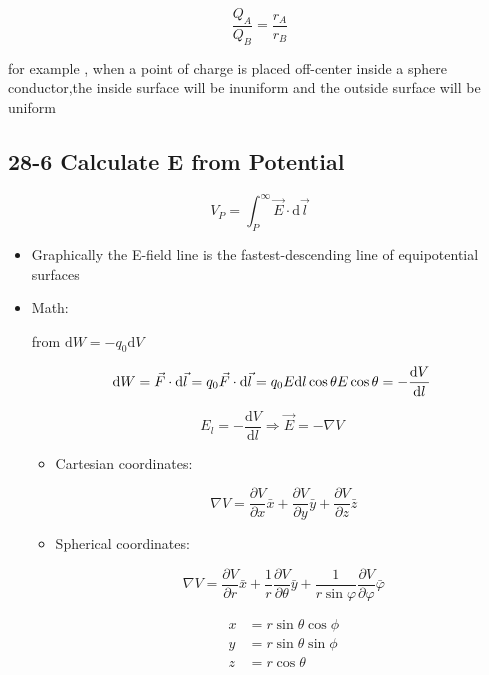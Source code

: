 \documentclass[
]{article}
\begin{document}
\[
\frac{Q_A}{Q_B}=\frac{r_A}{r_B}
\]

for example , when a point of charge is placed off-center inside a
sphere conductor,the inside surface will be inuniform and the outside
surface will be uniform

\hypertarget{calculate-e-from-potential}{%
\subsection{28-6 Calculate E from
Potential}\label{calculate-e-from-potential}}

\[
V_P=\int _{P}^{\infty }\vec E\cdot \mathrm d \vec l
\]

\begin{itemize}
\item
  Graphically the E-field line is the fastest-descending line of
  equipotential surfaces
\item
  Math:

  from \(\mathrm d W=-q_0 \mathrm d V\)

  \[
  \mathrm d W=\vec F\cdot \mathrm d\vec l=q_0\vec F\cdot \mathrm d \vec l=q_0E\mathrm d l\cos \theta\\E\cos \theta =-\frac{\mathrm d V}{\mathrm dl}
  \]

  \[
  E_l=-\frac{\mathrm d V}{\mathrm d l}\Rightarrow \vec E=-\nabla V
  \]

  \begin{itemize}
  \item
    Cartesian coordinates:

    \[
    \nabla V=\frac{\partial V}{\partial x}\bar x+\frac{\partial V}{\partial y}\bar y+\frac{\partial V}{\partial z}\bar z
    \]
  \item
    Spherical coordinates:

    \[
    \nabla V=\frac{\partial V}{\partial r}\bar x+\frac{1}{r}\frac{\partial V}{\partial \theta}\bar y+\frac{1}{r\sin \varphi}\frac{\partial V}{\partial \varphi}\bar \varphi
    \]

    \[
    \begin{align*}
    x & = r \sin \theta \cos \phi \\
    y & = r \sin \theta \sin \phi \\
    z & = r \cos \theta
    \end{align*}
    \]


\end{itemize}
\end{itemize}
\end{document}
